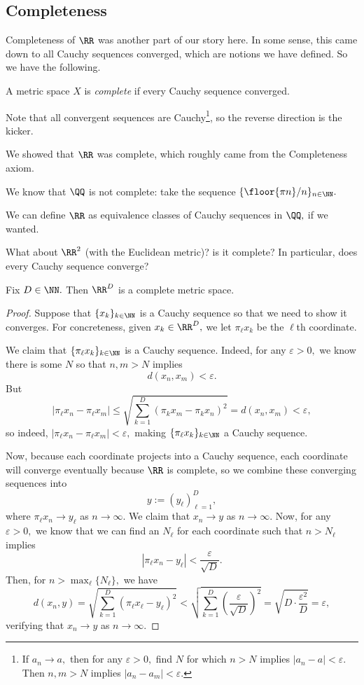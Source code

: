 \subsection{Completeness}
Completeness of $\RR$ was another part of our story here. In some sense, this came down to all Cauchy sequences converged, which are notions we have defined. So we have the following.
\begin{definition}[Complete]
	A metric space $X$ is \textit{complete} if every Cauchy sequence converged.
\end{definition}
Note that all convergent sequences are Cauchy\footnote{If $a_n\to a,$ then for any $\varepsilon>0,$ find $N$ for which $n>N$ implies $|a_n-a|<\varepsilon.$ Then $n,m>N$ implies $|a_n-a_m|<\varepsilon.$}, so the reverse direction is the kicker.
\begin{example}
	We showed that $\RR$ was complete, which roughly came from the Completeness axiom.
\end{example}
\begin{nex}
	We know that $\QQ$ is not complete: take the sequence $\{\floor{\pi n}/n\}_{n\in\NN}.$
\end{nex}
\begin{remark}
	We can define $\RR$ as equivalence classes of Cauchy sequences in $\QQ,$ if we wanted.
\end{remark}
What about $\RR^2$ (with the Euclidean metric)? is it complete? In particular, does every Cauchy sequence converge?
\begin{proposition}
	Fix $D\in\NN.$ Then $\RR^D$ is a complete metric space.
\end{proposition}
\begin{proof}
	Suppose that $\{x_k\}_{k\in\NN}$ is a Cauchy sequence so that we need to show it converges. For concreteness, given $x_k\in\RR^D,$ we let $\pi_\ell x_k$ be the $\ell$th coordinate.

	We claim that $\{\pi_\ell x_k\}_{k\in\NN}$ is a Cauchy sequence. Indeed, for any $\varepsilon>0,$ we know there is some $N$ so that $n,m>N$ implies
	\[d(x_n,x_m)<\varepsilon.\]
	But
	\[|\pi_\ell x_n-\pi_\ell x_m|\le\sqrt{\sum_{k=1}^D(\pi_kx_m-\pi_kx_n)^2}=d(x_n,x_m)<\varepsilon,\]
	so indeed, $|\pi_\ell x_n-\pi_\ell x_m|<\varepsilon,$ making $\{\pi_\ell x_k\}_{k\in\NN}$ a Cauchy sequence.

	Now, because each coordinate projects into a Cauchy sequence, each coordinate will converge eventually because $\RR$ is complete, so we combine these converging sequences into
	\[y:=(y_\ell)_{\ell=1}^D,\]
	where $\pi_\ell x_n\to y_\ell$ as $n\to\infty.$ We claim that $x_n\to y$ as $n\to\infty.$ Now, for any $\varepsilon>0,$ we know that we can find an $N_\ell$ for each coordinate such that $n>N_\ell$ implies
	\[|\pi_\ell x_n-y_\ell|<\frac{\varepsilon}{\sqrt D}.\]
	Then, for $n>\max_\ell\{N_\ell\},$ we have
	\[d(x_n,y)=\sqrt{\sum_{k=1}^D(\pi_\ell x_\ell-y_\ell)^2}<\sqrt{\sum_{k=1}^D\left(\frac{\varepsilon}{\sqrt D}\right)^2}=\sqrt{D\cdot\frac{\varepsilon^2}D}=\varepsilon,\]
	verifying that $x_n\to y$ as $n\to\infty.$
\end{proof}

